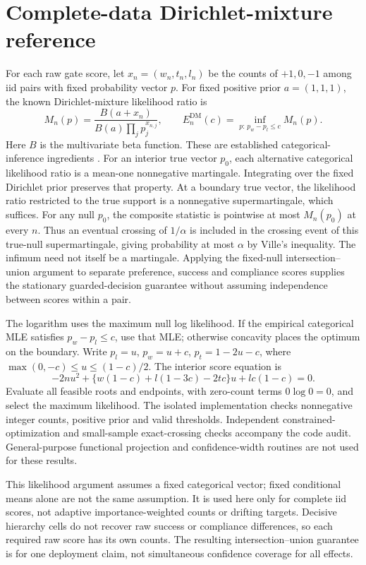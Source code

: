 \section{Complete-data Dirichlet-mixture reference}
\label{app:dm}
For each raw gate score, let $x_n=(w_n,t_n,l_n)$ be the counts of
$+1,0,-1$ among iid pairs with fixed probability vector $p$.
For fixed positive prior $a=(1,1,1)$, the known Dirichlet-mixture
likelihood ratio is
\[
 M_n(p)=\frac{B(a+x_n)}{B(a)\prod_jp_j^{x_{n,j}}},
 \qquad
 E_n^{\mathrm{DM}}(c)=\inf_{p:\,p_w-p_l\leq c}M_n(p).
\]
Here $B$ is the multivariate beta function. These are established
categorical-inference ingredients \citep{lindon2022multinomial}.
For an interior true vector $p_0$, each alternative categorical likelihood
ratio is a mean-one nonnegative martingale. Integrating over the fixed
Dirichlet prior preserves that property. At a boundary true vector,
the likelihood ratio restricted to the true support is a nonnegative
supermartingale, which suffices. For any null $p_0$, the composite
statistic is pointwise at most $M_n(p_0)$ at every $n$. Thus an eventual
crossing of $1/\alpha$ is included in the crossing event of this true-null
supermartingale, giving probability at most $\alpha$ by Ville's inequality.
The infimum need not itself be a martingale. Applying the fixed-null
intersection--union argument to separate preference, success and compliance
scores supplies the stationary guarded-decision guarantee without
assuming independence between scores within a pair.

The logarithm uses the maximum null log likelihood. If the empirical
categorical MLE satisfies $p_w-p_l\leq c$, use that MLE; otherwise
concavity places the optimum on the boundary. Write $p_l=u$,
$p_w=u+c$, $p_t=1-2u-c$, where
$\max(0,-c)\leq u\leq(1-c)/2$. The interior score equation is
\[
 -2nu^2+\{w(1-c)+l(1-3c)-2tc\}u+lc(1-c)=0.
\]
Evaluate all feasible roots and endpoints, with zero-count terms
$0\log0=0$, and select the maximum likelihood. The isolated implementation
checks nonnegative integer counts, positive prior and valid thresholds.
Independent constrained-optimization and small-sample exact-crossing
checks accompany the code audit. General-purpose functional projection
and confidence-width routines are not used for these results.

This likelihood argument assumes a fixed categorical vector; fixed
conditional means alone are not the same assumption. It is used here
only for complete iid scores, not adaptive importance-weighted counts
or drifting targets. Decisive hierarchy cells do not recover raw success
or compliance differences, so each required raw score has its own counts.
The resulting intersection--union guarantee is for one deployment claim,
not simultaneous confidence coverage for all effects.

